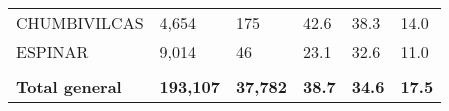 \begin{tabular}{llllll}
	\cellcolor[HTML]{F8CBAD}CHUMBIVILCAS                           & 4,654                                                                 & 175                                                              & 42.6                                                                             & 38.3                                                                        & 14.0                                                                                \\
	\cellcolor[HTML]{F8CBAD}ESPINAR                                & 9,014                                                                 & 46                                                               & 23.1                                                                             & 32.6                                                                        & 11.0                                                                                \\
	&                                                                       &                                                                  &                                                                                  &                                                                             &                                                                                     \\
	\rowcolor[HTML]{DDEBF7} 
	\textbf{Total   general}                                       & \textbf{193,107}                                                      & \textbf{37,782}                                                  & \textbf{38.7}                                                                    & \textbf{34.6}                                                               & \textbf{17.5}                                                                      
\end{tabular}